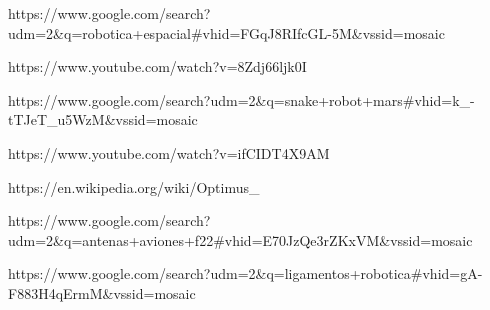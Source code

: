https://www.google.com/search?udm=2&q=robotica+espacial#vhid=FGqJ8RIfcGL-5M&vssid=mosaic

https://www.youtube.com/watch?v=8Zdj66ljk0I

https://www.google.com/search?udm=2&q=snake+robot+mars#vhid=k_-tTJeT_u5WzM&vssid=mosaic

https://www.youtube.com/watch?v=ifCIDT4X9AM

https://en.wikipedia.org/wiki/Optimus_%

https://www.google.com/search?udm=2&q=antenas+aviones+f22#vhid=E70JzQe3rZKxVM&vssid=mosaic

https://www.google.com/search?udm=2&q=ligamentos+robotica#vhid=gA-F883H4qErmM&vssid=mosaic


